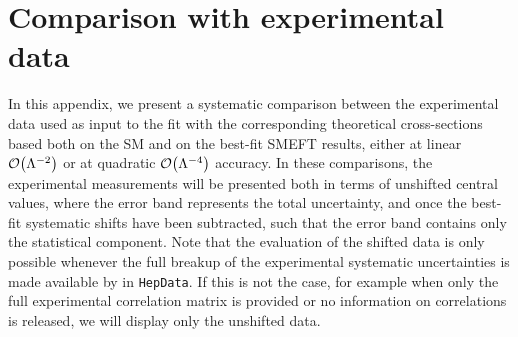 \section{Comparison with experimental data}
\label{sect:app_comparison_data}

In this appendix, we present a systematic comparison between the
experimental data used as input to the fit with  the corresponding theoretical cross-sections
based both on the SM and on the best-fit SMEFT results, either
 at  linear $\mathcal{O}\lp \Lambda^{-2}\rp$ or at quadratic $\mathcal{O}\lp \Lambda^{-4}\rp$ accuracy.
%
In these comparisons, the experimental measurements will be presented both
in terms of unshifted central values, where the error band represents the total uncertainty, and once
the best-fit systematic shifts have been subtracted, such that the error band contains only the statistical component.
%
Note that the evaluation of the shifted data is only possible whenever the full breakup of the experimental
systematic uncertainties is made available by in {\tt HepData}.
%
If this is not the case, for example when only the full experimental correlation matrix is provided
or no information on correlations is released, we will display only the unshifted data.

